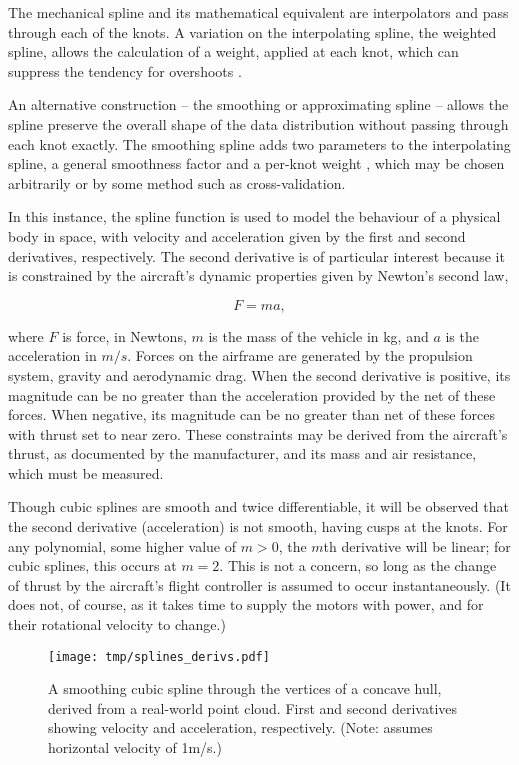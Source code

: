 \documentclass[doc]{apa6}
\begin{document}
The mechanical spline and its mathematical equivalent are interpolators and pass through each of the knots. A variation on the interpolating spline, the weighted spline, allows the calculation of a weight, applied at each knot, which can suppress the tendency for overshoots \parencite{lancaster1986curve}.

An alternative construction -- the smoothing or approximating spline -- allows the spline preserve the overall shape of the data distribution without passing through each knot exactly. The smoothing spline adds two parameters to the interpolating spline, a general smoothness factor and a per-knot weight \parencite{lancaster1986curve,deBoor1980}, which may be chosen arbitrarily or by some method such as cross-validation.

In this instance, the spline function is used to model the behaviour of a physical body in space, with velocity and acceleration given by the first and second derivatives, respectively. The second derivative is of particular interest because it is constrained by the aircraft's dynamic properties given by Newton's second law,

\begin{equation}
F = ma,
\end{equation} 

where $F$ is force, in Newtons, $m$ is the mass of the vehicle in kg, and $a$ is the acceleration in $m/s$. Forces on the airframe are generated by the propulsion system, gravity and aerodynamic drag. When the second derivative is positive, its magnitude can be no greater than the acceleration provided by the net of these forces. When negative, its magnitude can be no greater than net of these forces with thrust set to near zero. These constraints may be derived from the aircraft's thrust, as documented by the manufacturer, and its mass and air resistance, which must be measured. 

Though cubic splines are smooth and twice differentiable, it will be observed that the second derivative (acceleration) is not smooth, having cusps at the knots. For any polynomial, some higher value of $m > 0$, the $m$th derivative will be linear; for cubic splines, this occurs at $m = 2$. This is not a concern, so long as the change of thrust by the aircraft's flight controller is assumed to occur instantaneously. (It does not, of course, as it takes time to supply the motors with power, and for their rotational velocity to change.) 

\begin{figure} %
\texttt{[image: tmp/splines\_derivs.pdf]} 
\caption{A smoothing cubic spline through the vertices of a concave hull, derived from a real-world point cloud. First and second derivatives showing velocity and acceleration, respectively. (Note: assumes horizontal velocity of 1m/s.)}
\label{fig:cubic_derivatives}
\end{figure}
\end{document}
